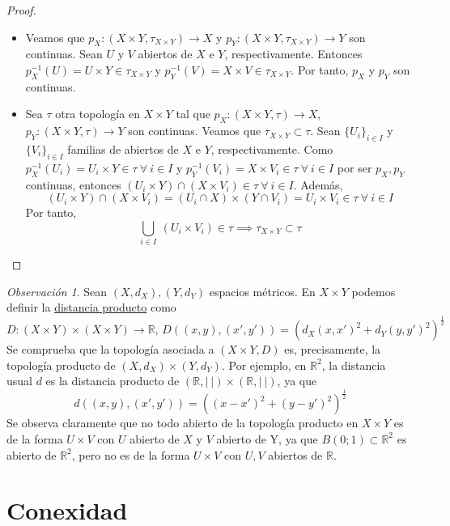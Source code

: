 \documentclass[12pt]{report}
\theoremstyle{definition}
\theoremstyle{definition}
\theoremstyle{remark}
\newtheorem*{obs}{Observación} %
\newcommand{\R}{\mathbb R}
\begin{document}
\begin{proof}
\hfill
\begin{itemize}
    \item Veamos que $p_X \colon (X \times Y, \tau_{X \times Y}) \to X$ y $p_Y \colon (X \times Y, \tau_{X \times Y}) \to Y$ son continuas. Sean $U$ y $V$ abiertos de $X$ e $Y$, respectivamente. Entonces $p_X^{-1}(U) = U \times Y \in \tau_{X \times Y}$ y $p_Y^{-1}(V) = X \times V \in \tau_{X \times Y}$. Por tanto, $p_X$ y $p_Y$ son continuas.
    \item Sea $\tau$ otra topología en $X \times Y$ tal que $p_X \colon (X \times Y, \tau) \to X$, $p_Y \colon (X \times Y, \tau) \to Y$ son continuas. Veamos que $\tau_{X \times Y} \subset \tau$. Sean $\{U_i\}_{i \in I}$ y $\{V_i\}_{i \in I}$ familias de abiertos de $X$ e $Y$, respectivamente. Como $p_X^{-1}(U_i) = U_i \times Y \in \tau \ \forall \ i \in I$ y $p_Y^{-1}(V_i) = X \times V_i \in \tau \ \forall \ i \in I$ por ser $p_X,p_Y$ continuas, entonces $(U_i \times Y) \cap (X \times V_i) \in \tau \ \forall \ i \in I$. Además,
    \[(U_i \times Y) \cap (X \times V_i) = (U_i \cap X) \times (Y \cap V_i) = U_i \times V_i \in \tau \ \forall \ i \in I\]
    Por tanto,
    \[\bigcup_{i \in I} \ (U_i \times V_i) \in \tau \implies \tau_{X \times Y} \subset \tau\]
\end{itemize}
\end{proof}

\begin{obs}
Sean $(X, d_X), (Y, d_Y)$ espacios métricos. En $X \times Y$ podemos definir la \ul{distancia producto} como \[D \colon (X \times Y) \times (X \times Y) \to \R \textrm{, } D((x,y),(x',y')) = (d_X(x,x')^2 + d_Y(y,y')^2)^{\frac{1}{2}}\]
Se comprueba que la topología asociada a $(X \times Y, D)$ es, precisamente, la topología producto de $(X, d_X) \times (Y, d_Y)$. Por ejemplo, en $\R^2$, la distancia usual $d$ es la distancia producto de $(\R, | \ |) \times (\R, | \ |)$, ya que \[d((x,y),(x',y')) = ((x-x')^2+(y-y')^2)^\frac{1}{2}\] Se observa claramente que no todo abierto de la topología producto en $X \times Y$ es de la forma $U \times V$ con $U$ abierto de $X$ y $V$ abierto de Y, ya que $B(0;1) \subset \R^2$ es abierto de $\R^2$, pero no es de la forma $U \times V$ con $U, V$ abiertos de $\R$.
\end{obs}

\chapter{Conexidad}
\end{document}
